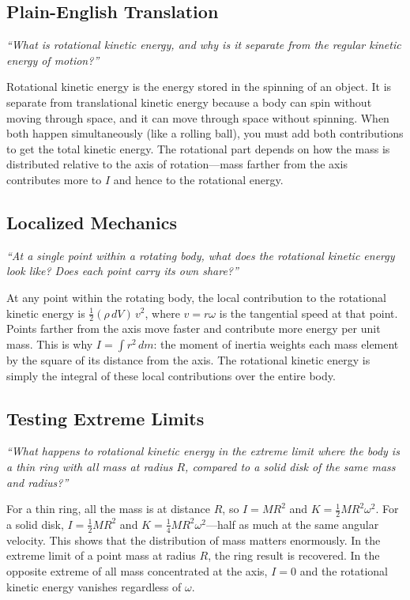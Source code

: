 \subsection*{Plain-English Translation}
\textit{``What is rotational kinetic energy, and why is it separate from the regular kinetic energy of motion?''}

Rotational kinetic energy is the energy stored in the spinning of an object. It is separate from translational kinetic energy because a body can spin without moving through space, and it can move through space without spinning. When both happen simultaneously (like a rolling ball), you must add both contributions to get the total kinetic energy. The rotational part depends on how the mass is distributed relative to the axis of rotation---mass farther from the axis contributes more to $I$ and hence to the rotational energy.

\subsection*{Localized Mechanics}
\textit{``At a single point within a rotating body, what does the rotational kinetic energy look like? Does each point carry its own share?''}

At any point within the rotating body, the local contribution to the rotational kinetic energy is $\frac{1}{2}(\rho\,dV)\,v^2$, where $v = r\omega$ is the tangential speed at that point. Points farther from the axis move faster and contribute more energy per unit mass. This is why $I = \int r^2\,dm$: the moment of inertia weights each mass element by the square of its distance from the axis. The rotational kinetic energy is simply the integral of these local contributions over the entire body.

\subsection*{Testing Extreme Limits}
\textit{``What happens to rotational kinetic energy in the extreme limit where the body is a thin ring with all mass at radius $R$, compared to a solid disk of the same mass and radius?''}

For a thin ring, all the mass is at distance $R$, so $I = MR^2$ and $K = \frac{1}{2}MR^2\omega^2$. For a solid disk, $I = \frac{1}{2}MR^2$ and $K = \frac{1}{4}MR^2\omega^2$---half as much at the same angular velocity. This shows that the distribution of mass matters enormously. In the extreme limit of a point mass at radius $R$, the ring result is recovered. In the opposite extreme of all mass concentrated at the axis, $I = 0$ and the rotational kinetic energy vanishes regardless of $\omega$.

